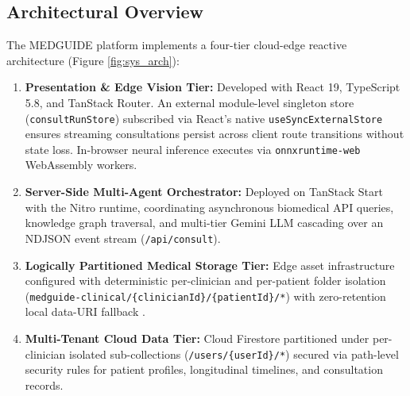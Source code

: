 \documentclass[journal,10pt,twocolumn]{IEEEtran}
\begin{document}
\subsection{Architectural Overview}
The MEDGUIDE platform implements a four-tier cloud-edge reactive architecture (Figure \ref{fig:sys_arch}):
\begin{enumerate}
    \item \textbf{Presentation \& Edge Vision Tier:} Developed with React 19, TypeScript 5.8, and TanStack Router. An external module-level singleton store (\texttt{consultRunStore}) subscribed via React's native \texttt{useSyncExternalStore} ensures streaming consultations persist across client route transitions without state loss. In-browser neural inference executes via \texttt{onnxruntime-web} WebAssembly workers.
    \item \textbf{Server-Side Multi-Agent Orchestrator:} Deployed on TanStack Start with the Nitro runtime, coordinating asynchronous biomedical API queries, knowledge graph traversal, and multi-tier Gemini LLM cascading over an NDJSON event stream (\texttt{/api/consult}).
    \item \textbf{Logically Partitioned Medical Storage Tier:} Edge asset infrastructure configured with deterministic per-clinician and per-patient folder isolation (\texttt{medguide-clinical/}\allowbreak\texttt{\{clinicianId\}/}\allowbreak\texttt{\{patientId\}/*}) with zero-retention local data-URI fallback \cite{cloudinary2024}.
    \item \textbf{Multi-Tenant Cloud Data Tier:} Cloud Firestore partitioned under per-clinician isolated sub-collections (\texttt{/users/}\allowbreak\texttt{\{userId\}/*}) secured via path-level security rules for patient profiles, longitudinal timelines, and consultation records.
\end{enumerate}
\end{document}
